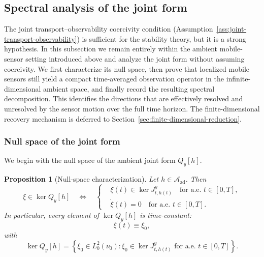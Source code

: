\documentclass{article}
\newtheorem{proposition}[theorem]{Proposition}
\theoremstyle{definition}
\begin{document}
\subsection{Spectral analysis of the joint form}
\label{subsec:spectral-analysis-mobile-sensors}

The joint transport--observability coercivity condition
(Assumption~\ref{ass:joint-transport-observability}) is sufficient for the stability theory, but it
is a strong hypothesis. In this subsection we remain entirely within the ambient mobile-sensor
setting introduced above and analyze the joint form without assuming coercivity. We first
characterize its null space, then prove that localized mobile sensors still yield a compact
time-averaged observation operator in the infinite-dimensional ambient space, and finally record the
resulting spectral decomposition. This identifies the directions that are effectively resolved and
unresolved by the sensor motion over the full time horizon. The finite-dimensional recovery mechanism
is deferred to Section~\ref{sec:finite-dimensional-reduction}.

\subsubsection{Null space of the joint form}

We begin with the null space of the ambient joint form \(Q_y[h]\).

\begin{proposition}[Null-space characterization]
    \label{prop:null-space-Q}
    Let \(h\in \mathcal A_{\mathrm{ad}}\). Then
    \[
        \xi\in\ker Q_y[h]
        \quad\Longleftrightarrow\quad
        \left\{
        \begin{aligned}
             & \xi(t)\in\ker J_{t,h(t)}^{y} \quad\text{for a.e.\ }t\in[0,T], \\
             & \dot\xi(t)=0 \quad\text{for a.e.\ }t\in[0,T].
        \end{aligned}
        \right.
    \]
    In particular, every element of \(\ker Q_y[h]\) is time-constant:
    \[
        \xi(t)\equiv \xi_0,
    \]
    with
    \begin{equation}
        \label{eq:null-space-Q}
        \ker Q_y[h]
        =
        \left\{
        \xi_0\in L^2_0(\nu_0):
        \xi_0\in\ker J_{t,h(t)}^{y}
        \text{ for a.e.\ }t\in[0,T]
        \right\}.
    \end{equation}
\end{proposition}
\end{document}
